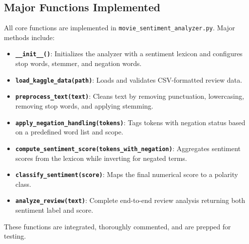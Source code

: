 \documentclass[12pt]{article}
\begin{document}
	\subsection*{Major Functions Implemented}
	All core functions are implemented in \texttt{movie\_sentiment\_analyzer.py}. Major methods include:
	
	\begin{itemize}
		\item \texttt{\textbf{\_\_init\_\_()}}: Initializes the analyzer with a sentiment lexicon and configures stop words, stemmer, and negation words.
		\item \texttt{\textbf{load\_kaggle\_data(path)}}: Loads and validates CSV-formatted review data.
		\item \texttt{\textbf{preprocess\_text(text)}}: Cleans text by removing punctuation, lowercasing, removing stop words, and applying stemming.
		\item \texttt{\textbf{apply\_negation\_handling(tokens)}}: Tags tokens with negation status based on a predefined word list and scope.
		\item \texttt{\textbf{compute\_sentiment\_score(tokens\_with\_negation)}}: Aggregates sentiment scores from the lexicon while inverting for negated terms.
		\item \texttt{\textbf{classify\_sentiment(score)}}: Maps the final numerical score to a polarity class.
		\item \texttt{\textbf{analyze\_review(text)}}: Complete end-to-end review analysis returning both sentiment label and score.
	\end{itemize}
	
	These functions are integrated, thoroughly commented, and are prepped for testing.
	
\end{document}
